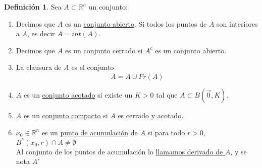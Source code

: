 \documentclass[10pt]{article}
\theoremstyle{definition}
\newtheorem{definition}{Definición}[section]
\begin{document}
\begin{definition}
    Sea $A\subset\mathbb{R}^n$ un conjunto:
    \begin{enumerate}
        \item Decimos que $A$ es un \underline{conjunto abierto}. Si todos los puntos de $A$ son interiores a $A$, es decir $A=int(A)$.
        \item Decimos que $A$ es un conjunto cerrado si $A^c$ es un conjunto abierto.
        \item La clausura de $A$ es el conjunto $$\overline{A}=A\cup Fr(A)$$
        \item $A$ es un \underline{conjunto acotado} si existe un $K>0$ tal que $A\subset B(\vec{0},K)$.
        \item $A$ es un \underline{conjunto compacto} si $A$ es cerrado y acotado.
        \item $x_0\in\mathbb{R}^n$ es un \underline{punto de acumulación} de $A$ si para todo $r>0$, $B^*(x_0,r)\cap A\ne\emptyset$
            \\Al conjunto de los puntos de acumulación lo \underline{llamamos derivado de $A$}, y se nota $A'$
    \end{enumerate}
\end{definition}
\end{document}
